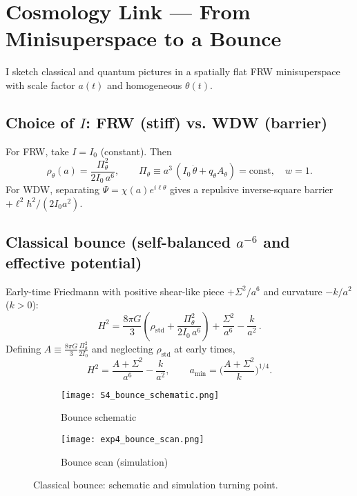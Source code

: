 \section{Cosmology Link --- From Minisuperspace to a Bounce}\label{sec:cosmology}

I sketch classical and quantum pictures in a spatially flat FRW minisuperspace with scale factor $a(t)$ and homogeneous $\theta(t)$.

\subsection{Choice of \texorpdfstring{$I$}{I}: FRW (stiff) vs. WDW (barrier)}\label{sec:i-of-a}
For FRW, take $I=I_0$ (constant). Then
\begin{equation}
\rho_\theta(a) = \frac{\Pi_\theta^2}{2 I_0\,a^6},\qquad \Pi_\theta\equiv a^3\,(I_0\,\dot\theta+q_\theta A_\theta)=\text{const},\quad w=1.
\end{equation}
For WDW, separating $\Psi=\chi(a)e^{i\ell\theta}$ gives a repulsive inverse-square barrier $+\ell^2\hbar^2/(2 I_0 a^2)$.

\subsection{Classical bounce (self-balanced \texorpdfstring{$a^{-6}$}{a^-6} and effective potential)}\label{sec:classical-bounce}
Early-time Friedmann with positive shear-like piece $+\Sigma^2/a^6$ and curvature $-k/a^2$ ($k>0$):
\begin{equation}
 H^2 = \frac{8\pi G}{3}\left(\rho_{\mathrm{std}} + \frac{\Pi_\theta^2}{2 I_0\,a^6}\right) + \frac{\Sigma^2}{a^6} - \frac{k}{a^2} \, .
\end{equation}
Defining $A\equiv \tfrac{8\pi G}{3}\tfrac{\Pi_\theta^2}{2I_0}$ and neglecting $\rho_{\mathrm{std}}$ at early times,
\begin{equation}
 H^2=\frac{A+\Sigma^2}{a^6} - \frac{k}{a^2},\qquad a_{\min}=\Big(\frac{A+\Sigma^2}{k}\Big)^{\!1/4} .
\end{equation}

\begin{figure}[h]
  \centering
  \begin{subfigure}[b]{0.48\linewidth}
    \centering
  \texttt{[image: S4\_bounce\_schematic.png]}
    \caption{Bounce schematic}
    \label{fig:bounce-schematic}
  \end{subfigure}\hfill
  \begin{subfigure}[b]{0.48\linewidth}
    \centering
  \texttt{[image: exp4\_bounce\_scan.png]}
    \caption{Bounce scan (simulation)}
    \label{fig:bounce-scan}
  \end{subfigure}
  \caption{Classical bounce: schematic and simulation turning point.}
  \label{fig:bounce}
\end{figure}

